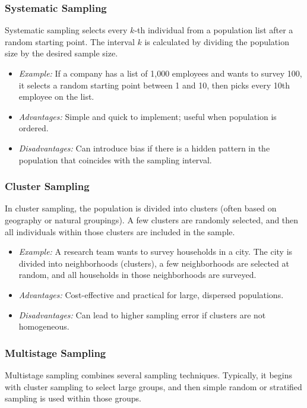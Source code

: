 \documentclass[twoside]{book}
\begin{document}
\subsubsection{Systematic Sampling}
Systematic sampling selects every $k$-th individual from a population list after a random starting point. The interval $k$ is calculated by dividing the population size by the desired sample size.

\begin{itemize}
\item \textit{Example:} If a company has a list of 1,000 employees and wants to survey 100, it selects a random starting point between 1 and 10, then picks every 10th employee on the list.

\item \textit{Advantages:} Simple and quick to implement; useful when population is ordered.

\item \textit{Disadvantages:} Can introduce bias if there is a hidden pattern in the population that coincides with the sampling interval.
\end{itemize}

\subsubsection{Cluster Sampling}
In cluster sampling, the population is divided into clusters (often based on geography or natural groupings). A few clusters are randomly selected, and then all individuals within those clusters are included in the sample.

\begin{itemize}
\item \textit{Example:} A research team wants to survey households in a city. The city is divided into neighborhoods (clusters), a few neighborhoods are selected at random, and all households in those neighborhoods are surveyed.

\item \textit{Advantages:} Cost-effective and practical for large, dispersed populations.

\item \textit{Disadvantages:} Can lead to higher sampling error if clusters are not homogeneous.
\end{itemize}

\subsubsection{Multistage Sampling}
Multistage sampling combines several sampling techniques. Typically, it begins with cluster sampling to select large groups, and then simple random or stratified sampling is used within those groups.
\end{document}
